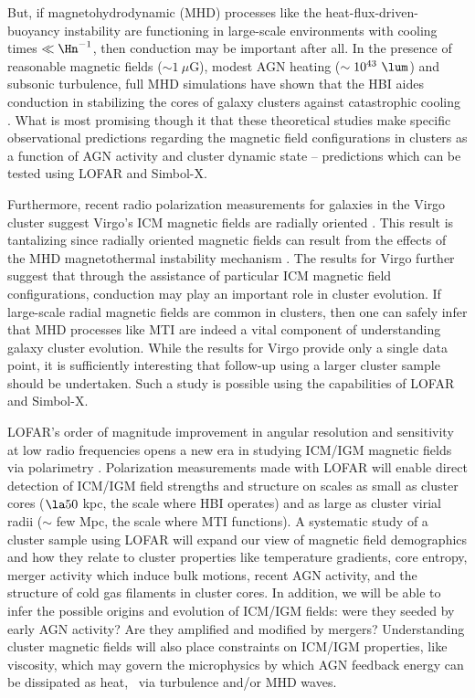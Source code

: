 \documentclass[12pt]{article}
\begin{document}
But, if magnetohydrodynamic (MHD) processes like the
heat-flux-driven-buoyancy instability
\cite[HBI,][]{2008ApJ...677L...9P} are functioning in large-scale
environments with cooling times $\ll \Hn^{-1}$, then conduction may be
important after all. In the presence of reasonable magnetic fields
($\sim 1~\mu$G), modest AGN heating ($\sim 10^{43}~\lum$) and subsonic
turbulence, full MHD simulations have shown that the HBI aides
conduction in stabilizing the cores of galaxy clusters against
catastrophic cooling \cite{2009ApJ...703...96P,
  2009arXiv0911.5198R}. What is most promising though it that these
theoretical studies make specific observational predictions regarding
the magnetic field configurations in clusters as a function of AGN
activity and cluster dynamic state -- predictions which can be tested
using LOFAR and Simbol-X.

Furthermore, recent radio polarization measurements for galaxies in
the Virgo cluster suggest Virgo's ICM magnetic fields are radially
oriented \cite{2009arXiv0911.2476P}. This result is tantalizing since
radially oriented magnetic fields can result from the effects of the
MHD magnetothermal instability mechanism
\cite[MTI,][]{2000ApJ...534..420B}. The results for Virgo further
suggest that through the assistance of particular ICM magnetic field
configurations, conduction may play an important role in cluster
evolution. If large-scale radial magnetic fields are common in
clusters, then one can safely infer that MHD processes like MTI are
indeed a vital component of understanding galaxy cluster
evolution. While the results for Virgo provide only a single data
point, it is sufficiently interesting that follow-up using a larger
cluster sample should be undertaken. Such a study is possible using
the capabilities of LOFAR and Simbol-X.

LOFAR's order of magnitude improvement in angular resolution and
sensitivity at low radio frequencies opens a new era in studying ICM/IGM
magnetic fields via polarimetry
\cite{2009ASPC..407...33A}. Polarization measurements made with LOFAR
will enable direct detection of ICM/IGM field strengths and structure on
scales as small as cluster cores ($\la 50$ kpc, the scale where HBI
operates) and as large as cluster virial radii ($\sim$ few Mpc, the
scale where MTI functions). A systematic study of a cluster sample
using LOFAR will expand our view of magnetic field demographics and
how they relate to cluster properties like temperature gradients, core
entropy, merger activity which induce bulk motions, recent AGN
activity, and the structure of cold gas filaments in cluster cores. In
addition, we will be able to infer the possible origins and evolution
of ICM/IGM fields: were they seeded by early AGN activity? Are they
amplified and modified by mergers? Understanding cluster magnetic
fields will also place constraints on ICM/IGM properties, like viscosity,
which may govern the microphysics by which AGN feedback energy can be
dissipated as heat, \eg\ via turbulence and/or MHD waves.
\end{document}
